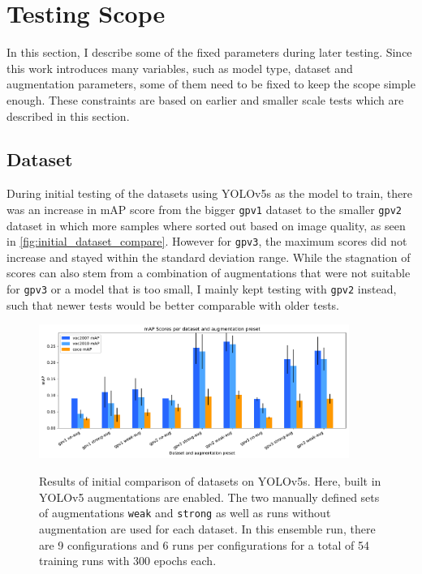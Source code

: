 \documentclass[10pt]{book}
\newcommand{\figureref}[1]{\autoref{#1}}
\begin{document}
\section{Testing Scope}

In this section, I describe some of the fixed parameters during later testing. Since this work introduces many variables, such as model type, dataset and augmentation parameters, some of them need to be fixed to keep the scope simple enough. These constraints are based on earlier and smaller scale tests which are described in this section.

\subsection{Dataset}

During initial testing of the datasets using \ac{YOLO}v5s as the model to train, there was an increase in \ac{mAP} score from the bigger \texttt{gpv1} dataset to the smaller \texttt{gpv2} dataset in which more samples where sorted out based on image quality, as seen in \figureref{fig:initial_dataset_compare}. However for \texttt{gpv3}, the maximum scores did not increase and stayed within the standard deviation range. While the stagnation of scores can also stem from a combination of augmentations that were not suitable for \texttt{gpv3} or a model that is too small, I mainly kept testing with \texttt{gpv2} instead, such that newer tests would be better comparable with older tests. 


\begin{figure}
  \caption{Results of initial comparison of datasets on \ac{YOLO}v5s. Here, built in \ac{YOLO}v5 augmentations are enabled. The two manually defined sets of augmentations \texttt{weak} and \texttt{strong} as well as runs without augmentation are used for each dataset. In this ensemble run, there are 9 configurations and 6 runs per configurations for a total of 54 training runs with 300 epochs each.}
  \includegraphics[width=0.9\textwidth]{image/gp-compare-v2-thesis}
  \label{fig:initial_dataset_compare}
\end{figure}
\end{document}
